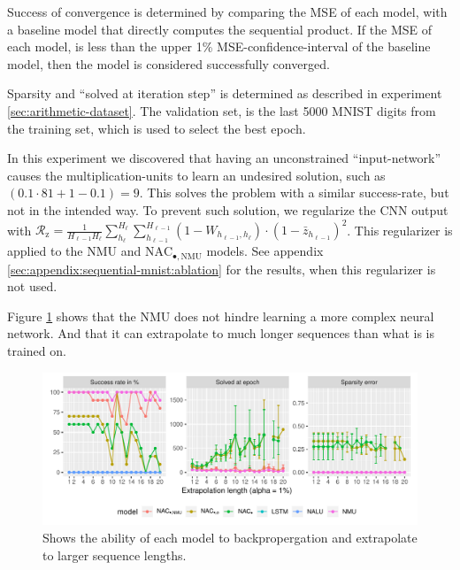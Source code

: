 Success of convergence is determined by comparing the MSE of each model, with a baseline model that directly computes the sequential product. If the MSE of each model, is less than the upper 1\% MSE-confidence-interval of the baseline model, then the model is considered successfully converged.

Sparsity and ``solved at iteration step'' is determined as described in experiment \ref{sec:arithmetic-dataset}. The validation set, is the last 5000 MNIST digits from the training set, which is used to select the best epoch.

In this experiment we discovered that having an unconstrained ``input-network'' causes the multiplication-units to learn an undesired solution, such as $(0.1 \cdot 81 + 1 - 0.1) = 9$. This solves the problem with a similar success-rate, but not in the intended way. To prevent such solution, we regularize the CNN output with $\mathcal{R}_{\mathrm{z}} = \frac{1}{H_{\ell-1} H_\ell} \sum_{h_\ell}^{H_\ell} \sum_{h_{\ell-1}}^{H_{\ell-1}} (1 - W_{h_{\ell-1},h_\ell}) \cdot (1 - \bar{z}_{h_{\ell-1}})^2$. This regularizer is applied to the NMU and $\mathrm{NAC}_{\bullet,\mathrm{NMU}}$ models. See appendix \ref{sec:appendix:sequential-mnist:ablation} for the results, when this regularizer is not used.

Figure \ref{fig:sequential-mnist-prod-results} shows that the NMU does not hindre learning a more complex neural network. And that it can extrapolate to much longer sequences than what is is trained on.

\begin{figure}[h]
\centering
\includegraphics[width=\linewidth,trim={0 0.5cm 0 0},clip]{results/sequential_mnist_prod_long.pdf}
\caption{Shows the ability of each model to backpropergation and extrapolate to larger sequence lengths.} 
\label{fig:sequential-mnist-prod-results}
\end{figure}

